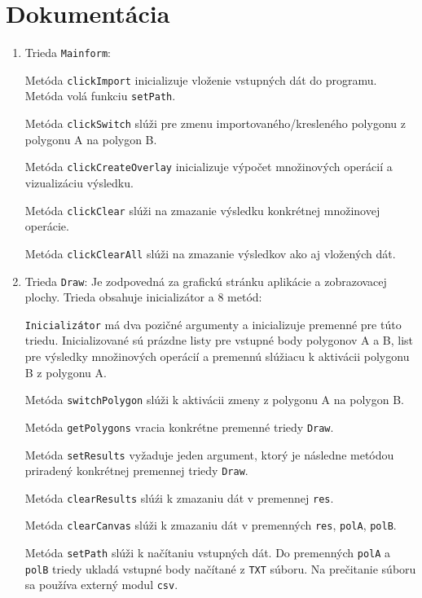 \documentclass[11pt]{article}
\begin{document}
\section{Dokumentácia}
\begin{enumerate}
    \item Trieda \texttt{Mainform}: 
    
    Metóda \texttt{clickImport} inicializuje vloženie vstupných dát do programu. Metóda volá funkciu \texttt{setPath}. 
    
    Metóda \texttt{clickSwitch} slúži pre zmenu importovaného/kresleného polygonu z polygonu A na polygon B. 
    
    Metóda \texttt{clickCreateOverlay} inicializuje výpočet množinových operácií a vizualizáciu výsledku. 
    
    Metóda \texttt{clickClear} slúži na zmazanie výsledku konkrétnej množinovej operácie. 
    
    Metóda \texttt{clickClearAll} slúži na zmazanie výsledkov ako aj vložených dát.

    
    \item Trieda \texttt{Draw}:
    Je zodpovedná za grafickú stránku aplikácie a zobrazovacej plochy. Trieda obsahuje inicializátor a 8 metód: 
    
    \texttt{Inicializátor} má dva pozičné argumenty a inicializuje premenné pre túto triedu. Inicializované sú prázdne listy pre vstupné body polygonov A a B, list pre výsledky množinových operácií a premennú slúžiacu k aktivácii polygonu B z polygonu A. 
    
    Metóda \texttt{switchPolygon} slúži k aktivácii zmeny z polygonu A na polygon B.
    
    Metóda \texttt{getPolygons} vracia konkrétne premenné triedy \texttt{Draw}.
    
    Metóda \texttt{setResults} vyžaduje jeden argument, ktorý je následne metódou priradený konkrétnej premennej triedy \texttt{Draw}. 
    
    Metóda \texttt{clearResults} slúźi k zmazaniu dát v premennej \texttt{res}.
    
    Metóda \texttt{clearCanvas} slúži k zmazaniu dát v premenných \texttt{res}, \texttt{polA}, \texttt{polB}.
    
    Metóda \texttt{setPath} slúži k načítaniu vstupných dát. Do premenných \texttt{polA} a \texttt{polB} triedy ukladá vstupné body načítané z \texttt{TXT} súboru. Na prečitanie súboru sa používa externý modul \texttt{csv}. 
    

\end{enumerate}
\end{document}
